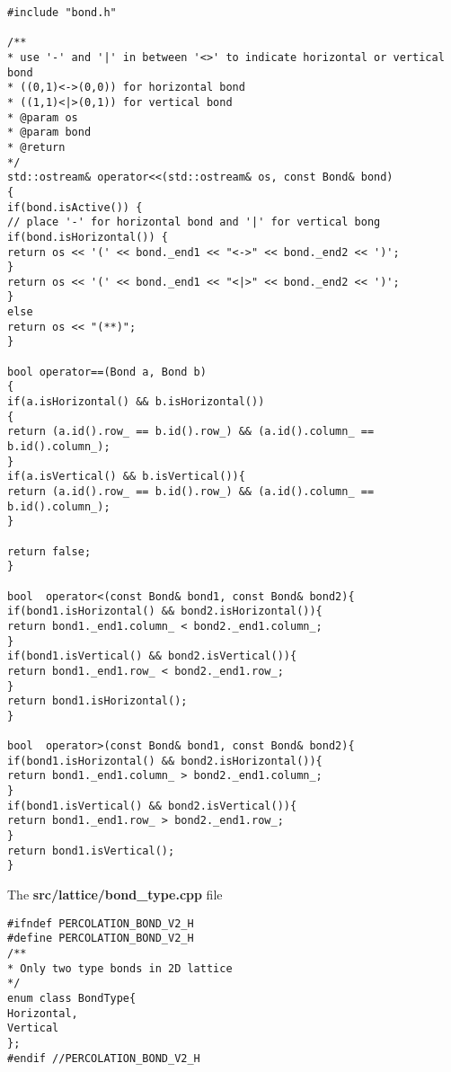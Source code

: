 \begin{lstlisting}[style=CStyle]
#include "bond.h"

/**
* use '-' and '|' in between '<>' to indicate horizontal or vertical bond
* ((0,1)<->(0,0)) for horizontal bond
* ((1,1)<|>(0,1)) for vertical bond
* @param os
* @param bond
* @return
*/
std::ostream& operator<<(std::ostream& os, const Bond& bond)
{
if(bond.isActive()) {
// place '-' for horizontal bond and '|' for vertical bong
if(bond.isHorizontal()) {
return os << '(' << bond._end1 << "<->" << bond._end2 << ')';
}
return os << '(' << bond._end1 << "<|>" << bond._end2 << ')';
}
else
return os << "(**)";
}

bool operator==(Bond a, Bond b)
{
if(a.isHorizontal() && b.isHorizontal())
{
return (a.id().row_ == b.id().row_) && (a.id().column_ == b.id().column_);
}
if(a.isVertical() && b.isVertical()){
return (a.id().row_ == b.id().row_) && (a.id().column_ == b.id().column_);
}

return false;
}

bool  operator<(const Bond& bond1, const Bond& bond2){
if(bond1.isHorizontal() && bond2.isHorizontal()){
return bond1._end1.column_ < bond2._end1.column_;
}
if(bond1.isVertical() && bond2.isVertical()){
return bond1._end1.row_ < bond2._end1.row_;
}
return bond1.isHorizontal();
}

bool  operator>(const Bond& bond1, const Bond& bond2){
if(bond1.isHorizontal() && bond2.isHorizontal()){
return bond1._end1.column_ > bond2._end1.column_;
}
if(bond1.isVertical() && bond2.isVertical()){
return bond1._end1.row_ > bond2._end1.row_;
}
return bond1.isVertical();
}
\end{lstlisting}


The \textbf{src/lattice/bond\_type.cpp} file

\begin{lstlisting}[style=CStyle]
#ifndef PERCOLATION_BOND_V2_H
#define PERCOLATION_BOND_V2_H
/**
* Only two type bonds in 2D lattice
*/
enum class BondType{
Horizontal,
Vertical
};
#endif //PERCOLATION_BOND_V2_H
\end{lstlisting}